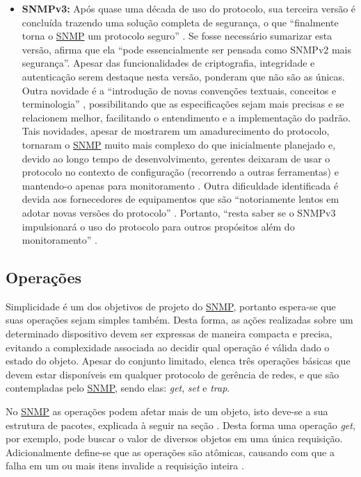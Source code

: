 \documentclass[twoside,english,brazilian]{UNISINOSmonografia}
\begin{document}
\begin{itemize}
\item \textbf{SNMPv3:}
Após quase uma década de uso do protocolo, sua terceira versão é concluída 
trazendo uma solução completa de segurança, o que ``finalmente torna o \hyperref[siglas]{SNMP} um 
protocolo seguro'' \cite[p.~260]{Clemm2006}.
Se fosse necessário sumarizar esta versão,  afirma que 
ela ``pode essencialmente ser pensada como SNMPv2 mais segurança''.
Apesar das funcionalidades de criptografia, integridade e autenticação serem 
destaque nesta versão,  ponderam que não são as únicas.
Outra novidade é a ``introdução de novas convenções textuais, conceitos e 
terminologia'' \cite[p.~73]{Mauro2009}, possibilitando que as especificações sejam 
mais precisas e se relacionem melhor, facilitando o entendimento e 
a implementação do padrão.
Tais novidades, apesar de mostrarem um amadurecimento do protocolo, tornaram o 
\hyperref[siglas]{SNMP} muito mais complexo do que inicialmente planejado e, devido ao longo 
tempo de desenvolvimento, gerentes deixaram de usar o protocolo no contexto de 
configuração (recorrendo a outras ferramentas) e mantendo-o apenas para 
monitoramento \cite{Clemm2006}.
Outra dificuldade identificada é devida aos fornecedores de equipamentos que 
são ``notoriamente lentos em adotar novas versões do protocolo'' 
\cite[p.~76]{Ding2009}.
Portanto, ``resta saber se o SNMPv3 impulsionará o uso do protocolo para 
outros propósitos além do monitoramento'' \cite[p.~261]{Clemm2006}.

\end{itemize}

\subsection{Operações}

Simplicidade é um dos objetivos de projeto do \hyperref[siglas]{SNMP}, portanto espera-se que
suas operações sejam simples também.
Desta forma, as ações realizadas sobre um determinado dispositivo devem ser 
expressas de maneira compacta e precisa, evitando a complexidade associada ao 
decidir qual operação é válida dado o estado do objeto.
Apesar do conjunto limitado,  elenca três 
operações básicas que devem estar disponíveis em qualquer protocolo de 
gerência de redes, e que são contempladas pelo \hyperref[siglas]{SNMP}, sendo elas: 
\textit{get}, \textit{set} e \textit{trap}.

No \hyperref[siglas]{SNMP} as operações podem afetar mais de um objeto, isto deve-se a sua 
estrutura de pacotes, explicada à seguir na seção .
Desta forma uma operação \textit{get}, por exemplo, pode buscar o valor de 
diversos objetos em uma única requisição.
Adicionalmente define-se que as operações são atômicas, causando com que a 
falha em um ou mais itens invalide a requisição inteira \cite{Simoneau1999}.
\end{document}
